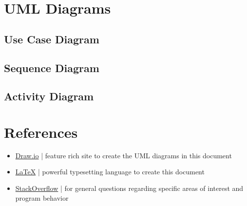 \documentclass[12pt]{article}
\begin{document}
\section{UML Diagrams}

\subsection{Use Case Diagram}

\subsection{Sequence Diagram}


\subsection{Activity Diagram}

\newpage

\section{References}

\begin{itemize}
\item \href{https://app.diagrams.net/}{Draw.io} | feature rich site to create the UML diagrams in this document
\item \href{https://www.latex-project.org/}{\LaTeX} | powerful typesetting language to create this document
\item \href{https://stackoverflow.com/}{StackOverflow} | for general questions regarding specific areas of interest and program behavior
\end{itemize}
\end{document}
